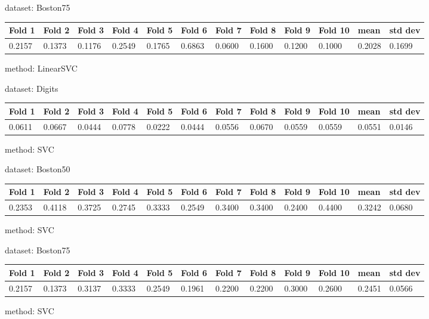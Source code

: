 \documentclass{article}
\begin{document}
\noindent dataset: Boston75

\begin{center}
	\begin{tabular}  { | l | l | l | l | l | l | l | l | l | l | l | l | }
	\hline
	Fold 1 & Fold 2 & Fold 3 & Fold 4 & Fold 5 & Fold 6 & Fold 7 & Fold 8 & Fold 9 & Fold 10 & mean & std dev\\ \hline
	0.2157 & 0.1373 & 0.1176 & 0.2549 & 0.1765 & 0.6863 & 0.0600 & 0.1600 & 0.1200 & 0.1000 & 0.2028 & 0.1699\\
	\hline
	\end{tabular}
\end{center}
\noindent method: LinearSVC

\noindent dataset: Digits

\begin{center}
	\begin{tabular}  { | l | l | l | l | l | l | l | l | l | l | l | l | }
	\hline
	Fold 1 & Fold 2 & Fold 3 & Fold 4 & Fold 5 & Fold 6 & Fold 7 & Fold 8 & Fold 9 & Fold 10 & mean & std dev\\ \hline
	0.0611 & 0.0667 & 0.0444 & 0.0778 & 0.0222 & 0.0444 & 0.0556 & 0.0670 & 0.0559 & 0.0559 & 0.0551 & 0.0146\\
	\hline
	\end{tabular}
\end{center}
\noindent method: SVC

\noindent dataset: Boston50

\begin{center}
	\begin{tabular}  { | l | l | l | l | l | l | l | l | l | l | l | l | }
	\hline
	Fold 1 & Fold 2 & Fold 3 & Fold 4 & Fold 5 & Fold 6 & Fold 7 & Fold 8 & Fold 9 & Fold 10 & mean & std dev\\ \hline
	0.2353 & 0.4118 & 0.3725 & 0.2745 & 0.3333 & 0.2549 & 0.3400 & 0.3400 & 0.2400 & 0.4400 & 0.3242 & 0.0680\\
	\hline
	\end{tabular}
\end{center}
\noindent method: SVC

\noindent dataset: Boston75

\begin{center}
	\begin{tabular}  { | l | l | l | l | l | l | l | l | l | l | l | l | }
	\hline
	Fold 1 & Fold 2 & Fold 3 & Fold 4 & Fold 5 & Fold 6 & Fold 7 & Fold 8 & Fold 9 & Fold 10 & mean & std dev\\ \hline
	0.2157 & 0.1373 & 0.3137 & 0.3333 & 0.2549 & 0.1961 & 0.2200 & 0.2200 & 0.3000 & 0.2600 & 0.2451 & 0.0566\\
	\hline
	\end{tabular}
\end{center}
\noindent method: SVC
\end{document}
